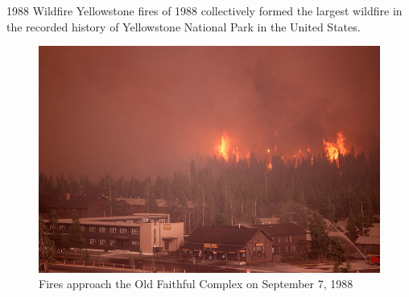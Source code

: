 \documentclass[xcolor=dvipsnames]{beamer}
\begin{document}
\begin{frame}{1988 Wildfire}
Yellowstone fires of 1988 collectively formed the largest wildfire in the recorded history of Yellowstone National Park in the United States.

\begin{figure}
\centering\includegraphics[width=.7\linewidth]{ysnpfire.jpg}
\captionsetup{labelformat=empty}
\caption{Fires approach the Old Faithful Complex on September 7, 1988}
\end{figure}
\end{frame}
\end{document}
